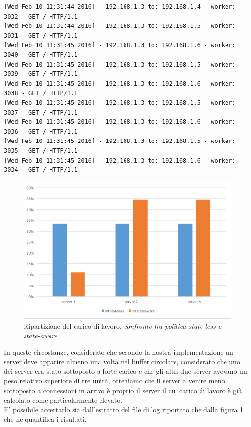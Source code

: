 \documentclass[italian]{tktltiki2}
\begin{document}
\begin{lstlisting}[basicstyle=\fontsize{6.4}{7}\selectfont\ttfamily]
[Wed Feb 10 11:31:44 2016] - 192.168.1.3 to: 192.168.1.4 - worker: 3032 - GET / HTTP/1.1
[Wed Feb 10 11:31:44 2016] - 192.168.1.3 to: 192.168.1.5 - worker: 3031 - GET / HTTP/1.1
[Wed Feb 10 11:31:45 2016] - 192.168.1.3 to: 192.168.1.6 - worker: 3040 - GET / HTTP/1.1
[Wed Feb 10 11:31:45 2016] - 192.168.1.3 to: 192.168.1.5 - worker: 3039 - GET / HTTP/1.1
[Wed Feb 10 11:31:45 2016] - 192.168.1.3 to: 192.168.1.6 - worker: 3038 - GET / HTTP/1.1
[Wed Feb 10 11:31:45 2016] - 192.168.1.3 to: 192.168.1.5 - worker: 3037 - GET / HTTP/1.1
[Wed Feb 10 11:31:45 2016] - 192.168.1.3 to: 192.168.1.6 - worker: 3036 - GET / HTTP/1.1
[Wed Feb 10 11:31:45 2016] - 192.168.1.3 to: 192.168.1.5 - worker: 3035 - GET / HTTP/1.1
[Wed Feb 10 11:31:45 2016] - 192.168.1.3 to: 192.168.1.6 - worker: 3034 - GET / HTTP/1.1
\end{lstlisting}
\begin{figure}[H]
\centering
\includegraphics[width=\textwidth]{images/round_robin_cfr}
\caption{Ripartizione del carico di lavoro, \emph{confronto fra politica state-less e state-aware}\label{fig: rrobin_cfr}}
\end{figure}
In queste circostanze, considerato che secondo la nostra implementazione un server deve apparire almeno una volta nel buffer circolare, considerato che uno dei server era stato sottoposto a forte carico e che gli altri due server avevano un peso relativo superiore di tre unità, otteniamo che il server a venire meno sottoposto a connessioni in arrivo è proprio il server il cui carico di lavoro è già calcolato come particolarmente elevato. \\
E' possibile accertarlo sia dall'estratto del file di log riportato che dalla figura \ref{fig: rrobin_cfr} che ne quantifica i risultati.
\newpage
\end{document}
